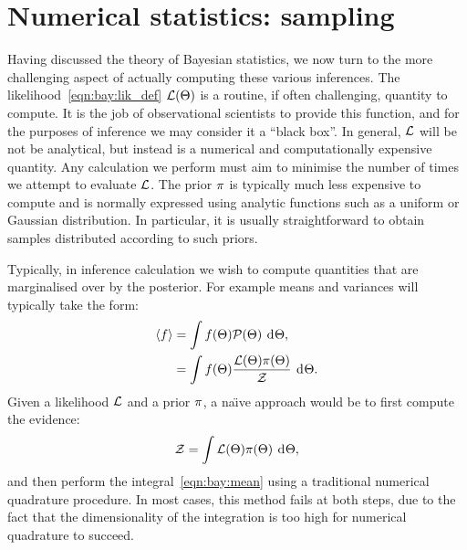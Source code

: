 \section{Numerical statistics: sampling}
\label{sec:bay:samp}
Having discussed the theory of Bayesian statistics, we now turn to the more challenging aspect of actually computing these various inferences. The likelihood~\eqref{eqn:bay:lik_def} \(\mathcal{L}(\Theta)\) is a routine, if often challenging, quantity to compute. It is the job of observational scientists to provide this function, and for the purposes of inference we may consider it a ``black box''. In general, \(\mathcal{L}\) will be not be analytical, but instead is a numerical and computationally expensive quantity. Any calculation we perform must aim to minimise the number of times we attempt to evaluate \(\mathcal{L}\). The prior \(\pi\) is typically much less expensive to compute and is normally expressed using analytic functions such as a uniform or Gaussian distribution. In particular, it is usually straightforward to obtain samples distributed according to such priors.

Typically, in inference calculation we wish to compute quantities that are marginalised over by the posterior. For example means and variances will typically take the form:
\begin{align}
  {\left\langle{f}\right\rangle} 
  &= \int f(\Theta)\mathcal{P}(\Theta)\:\operatorname{d}^{}\!{\Theta},
  \label{eqn:bay:mean}\\
  &= \int f(\Theta)\frac{\mathcal{L}(\Theta)\pi(\Theta)}{\mathcal{Z}}\:\operatorname{d}^{}\!{\Theta}.
\end{align}
Given a likelihood \(\mathcal{L}\) and a prior \(\pi\), a na\"{\i}ve approach would be to first compute the evidence:
\begin{equation}
  \mathcal{Z} = \int \mathcal{L}(\Theta) \pi(\Theta) \: \operatorname{d}^{}\!{\Theta},
  \label{eqn:bay:ev_short}
\end{equation}
and then perform the integral~\eqref{eqn:bay:mean} using a traditional numerical quadrature procedure. In most cases, this method fails at both steps, due to the fact that the dimensionality of the integration is too high for numerical quadrature to succeed.

